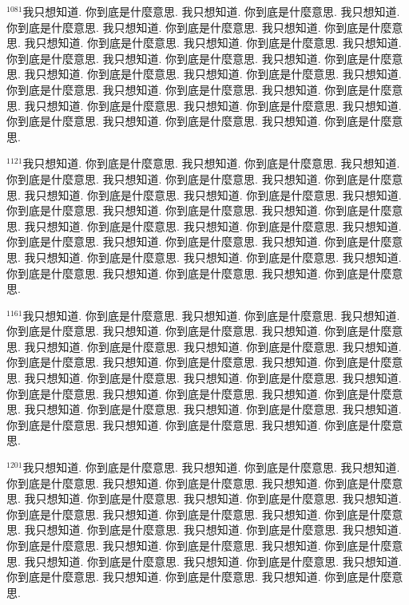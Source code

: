 \documentclass{book}
\begin{document}
$^{1081}$我只想知道.
你到底是什麼意思.
我只想知道.
你到底是什麼意思.
我只想知道.
你到底是什麼意思.
我只想知道.
你到底是什麼意思.
我只想知道.
你到底是什麼意思.
我只想知道.
你到底是什麼意思.
我只想知道.
你到底是什麼意思.
我只想知道.
你到底是什麼意思.
我只想知道.
你到底是什麼意思.
我只想知道.
你到底是什麼意思.
我只想知道.
你到底是什麼意思.
我只想知道.
你到底是什麼意思.
我只想知道.
你到底是什麼意思.
我只想知道.
你到底是什麼意思.
我只想知道.
你到底是什麼意思.
我只想知道.
你到底是什麼意思.
我只想知道.
你到底是什麼意思.
我只想知道.
你到底是什麼意思.
我只想知道.
你到底是什麼意思.
我只想知道.
你到底是什麼意思.

$^{1121}$我只想知道.
你到底是什麼意思.
我只想知道.
你到底是什麼意思.
我只想知道.
你到底是什麼意思.
我只想知道.
你到底是什麼意思.
我只想知道.
你到底是什麼意思.
我只想知道.
你到底是什麼意思.
我只想知道.
你到底是什麼意思.
我只想知道.
你到底是什麼意思.
我只想知道.
你到底是什麼意思.
我只想知道.
你到底是什麼意思.
我只想知道.
你到底是什麼意思.
我只想知道.
你到底是什麼意思.
我只想知道.
你到底是什麼意思.
我只想知道.
你到底是什麼意思.
我只想知道.
你到底是什麼意思.
我只想知道.
你到底是什麼意思.
我只想知道.
你到底是什麼意思.
我只想知道.
你到底是什麼意思.
我只想知道.
你到底是什麼意思.
我只想知道.
你到底是什麼意思.

$^{1161}$我只想知道.
你到底是什麼意思.
我只想知道.
你到底是什麼意思.
我只想知道.
你到底是什麼意思.
我只想知道.
你到底是什麼意思.
我只想知道.
你到底是什麼意思.
我只想知道.
你到底是什麼意思.
我只想知道.
你到底是什麼意思.
我只想知道.
你到底是什麼意思.
我只想知道.
你到底是什麼意思.
我只想知道.
你到底是什麼意思.
我只想知道.
你到底是什麼意思.
我只想知道.
你到底是什麼意思.
我只想知道.
你到底是什麼意思.
我只想知道.
你到底是什麼意思.
我只想知道.
你到底是什麼意思.
我只想知道.
你到底是什麼意思.
我只想知道.
你到底是什麼意思.
我只想知道.
你到底是什麼意思.
我只想知道.
你到底是什麼意思.
我只想知道.
你到底是什麼意思.

$^{1201}$我只想知道.
你到底是什麼意思.
我只想知道.
你到底是什麼意思.
我只想知道.
你到底是什麼意思.
我只想知道.
你到底是什麼意思.
我只想知道.
你到底是什麼意思.
我只想知道.
你到底是什麼意思.
我只想知道.
你到底是什麼意思.
我只想知道.
你到底是什麼意思.
我只想知道.
你到底是什麼意思.
我只想知道.
你到底是什麼意思.
我只想知道.
你到底是什麼意思.
我只想知道.
你到底是什麼意思.
我只想知道.
你到底是什麼意思.
我只想知道.
你到底是什麼意思.
我只想知道.
你到底是什麼意思.
我只想知道.
你到底是什麼意思.
我只想知道.
你到底是什麼意思.
我只想知道.
你到底是什麼意思.
我只想知道.
你到底是什麼意思.
我只想知道.
你到底是什麼意思.
\end{document}
